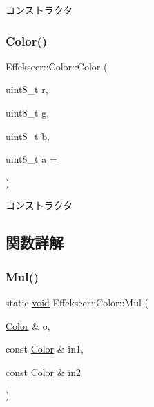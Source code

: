 コンストラクタ 

\mbox{\label{struct_effekseer_1_1_color_ace968f910830ff624662b5371b559703}} 
\subsubsection{\texorpdfstring{Color()}{Color()}\hspace{0.1cm}{\footnotesize\ttfamily [2/2]}}
{\footnotesize\ttfamily Effekseer\+::\+Color\+::\+Color (\begin{DoxyParamCaption}\item[{uint8\+\_\+t}]{r,  }\item[{uint8\+\_\+t}]{g,  }\item[{uint8\+\_\+t}]{b,  }\item[{uint8\+\_\+t}]{a = {} }\end{DoxyParamCaption})}



コンストラクタ 



\subsection{関数詳解}
\mbox{\label{struct_effekseer_1_1_color_a1f8aa17da0c0d56ca8938eeb9fa9f3e0}} 
\subsubsection{\texorpdfstring{Mul()}{Mul()}}
{\footnotesize\ttfamily static \mbox{\hyperlink{namespace_effekseer_ab34c4088e512200cf4c2716f168deb56}{void}} Effekseer\+::\+Color\+::\+Mul (\begin{DoxyParamCaption}\item[{\mbox{\hyperlink{struct_effekseer_1_1_color}{Color}} \&}]{o,  }\item[{const \mbox{\hyperlink{struct_effekseer_1_1_color}{Color}} \&}]{in1,  }\item[{const \mbox{\hyperlink{struct_effekseer_1_1_color}{Color}} \&}]{in2 }\end{DoxyParamCaption})\hspace{0.3cm}{\ttfamily [static]}}



